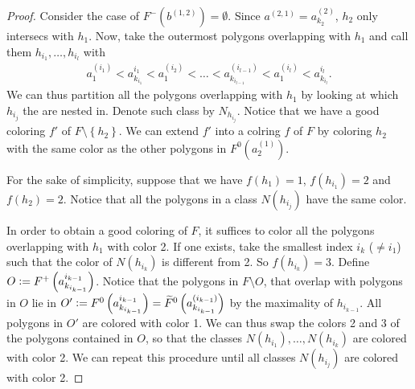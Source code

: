 \documentclass[12pt]{article}
\theoremstyle{definition}
\newcommand{\defeq}{\vcentcolon=}
\begin{document}
\begin{proof}
         Consider the case of
         $F^{-}\left(b^{\left(1, 2\right)}\right) = \emptyset$.
         Since $a^{\left(2, 1\right)} = 
         a_{k_2}^{\left(2\right)}$,
         $h_2$ only intersecs with $h_1$.
         Now, take the outermost polygons
         overlapping with $h_1$ and
         call them $h_{i_1}, \ldots, h_{i_{l}}$ with
         \begin{gather*}
             a_1^{\left(i_1\right)} <
             a_{k_{i_1}}^{i_1} <
             a_1^{\left(i_2\right)} < 
             \ldots <
             a_{k_{i_{l - 1}}}^{\left(i_{l - 1}\right)} <
             a_1^{\left(i_{l}\right)} <
             a_{k_{i_{l}}}^{i_{l}}.
         \end{gather*}
         We can thus partition all the
         polygons overlapping with
         $h_1$ by looking at which $h_{i_{j}}$ 
         the are nested in. Denote
         such class by $N_{h_{i_{j}}}$.
         Notice that we have a good coloring
         $f'$ of $F \setminus \left\{h_2\right\}$.
         We can extend $f'$ into a colring
         $f$ of $F$ by coloring $h_2$ with
         the same color as the other polygons in
         $F^{0}\left(a_2^{\left(1\right)}\right)$.

         For the sake of simplicity,
         suppose that we have
         $f\left(h_1\right) = 1$,
         $f\left(h_{i_1}\right) = 2$ and
         $f\left(h_2\right) = 2$.
         Notice that all the polygons
         in a class $N\left(h_{i_{j}}\right)$ 
         have the same color.

         In order to obtain a good coloring
         of $F$, it suffices to color all the polygons
         overlapping with $h_1$ with color 2.
         If one exists, take the smallest index
         $i_{k}$ ($\neq i_1$) such that 
         the color of $N\left(h_{i_{k}}\right)$ 
         is different from 2. So $f\left(h_{i_{k}}\right) = 3$.
         Define $O \defeq F^{+}\left(a_{k_{i_{k-1}}}^{i_{k-1}}\right)$.
         Notice that the polygons 
         in $F \setminus O$, that overlap
         with polygons in $O$ lie in
         $O' \defeq F^{0}\left(a_{k_{i_{k-1}}}^{i_{k-1}}\right) =
         \widetilde{F}^{0}\left(a_{k_{i_{k-1}}}^{\left(i_{k-1}\right)}\right)$
         by the maximality of $h_{i_{k-1}}$.
         All polygons in $O'$ are colored
         with color 1.
         We can thus swap the colors
         2 and 3 of the polygons 
         contained in $O$, so that
         the classes $N\left(h_{i_1}\right),
         \ldots, N\left(h_{i_{k}}\right)$ are
         colored with color 2.
         We can repeat this procedure until
         all classes $N\left(h_{i_{j}}\right)$ 
         are colored with color 2.


\end{proof}
\end{document}

